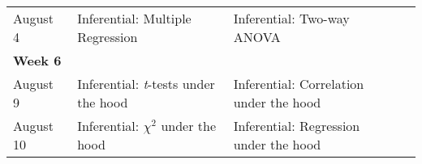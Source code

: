 \documentclass[
]{book}
\begin{document}
\begin{longtable}[]{@{}llll@{}}
\begin{minipage}[t]{0.09\columnwidth}\raggedright
August 4\strut
\end{minipage} & \begin{minipage}[t]{0.32\columnwidth}\raggedright
Inferential: Multiple Regression\strut
\end{minipage} & \begin{minipage}[t]{0.29\columnwidth}\raggedright
Inferential: Two-way ANOVA\strut
\end{minipage} & \begin{minipage}[t]{0.18\columnwidth}\raggedright
\strut
\end{minipage}\tabularnewline
\begin{minipage}[t]{0.09\columnwidth}\raggedright
\textbf{Week 6}\strut
\end{minipage} & \begin{minipage}[t]{0.32\columnwidth}\raggedright
\strut
\end{minipage} & \begin{minipage}[t]{0.29\columnwidth}\raggedright
\strut
\end{minipage} & \begin{minipage}[t]{0.18\columnwidth}\raggedright
\strut
\end{minipage}\tabularnewline
\begin{minipage}[t]{0.09\columnwidth}\raggedright
August 9\strut
\end{minipage} & \begin{minipage}[t]{0.32\columnwidth}\raggedright
Inferential: \emph{t}-tests under the hood\strut
\end{minipage} & \begin{minipage}[t]{0.29\columnwidth}\raggedright
Inferential: Correlation under the hood\strut
\end{minipage} & \begin{minipage}[t]{0.18\columnwidth}\raggedright
\strut
\end{minipage}\tabularnewline
\begin{minipage}[t]{0.09\columnwidth}\raggedright
August 10\strut
\end{minipage} & \begin{minipage}[t]{0.32\columnwidth}\raggedright
Inferential: \(\chi^2\) under the hood\strut
\end{minipage} & \begin{minipage}[t]{0.29\columnwidth}\raggedright
Inferential: Regression under the hood\strut
\end{minipage} & \begin{minipage}[t]{0.18\columnwidth}\raggedright

\end{minipage}
\end{longtable}
\end{document}
